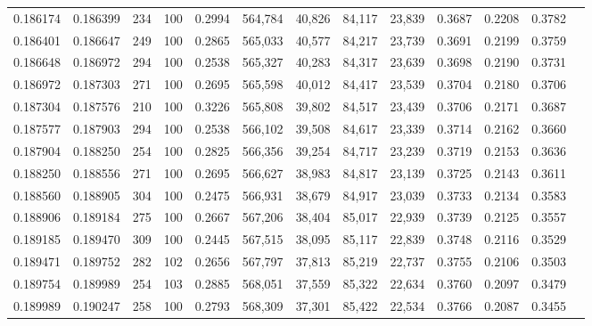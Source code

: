 \begin{tabular}{rrrrrrrrrrrrr}
0.186174 & 0.186399 &   234 & 100 &                                     0.2994 & 564,784 &  40,826 &  84,117 &  23,839 & 0.3687 & 0.2208 & 0.3782 \\
0.186401 & 0.186647 &   249 & 100 &                                     0.2865 & 565,033 &  40,577 &  84,217 &  23,739 & 0.3691 & 0.2199 & 0.3759 \\
0.186648 & 0.186972 &   294 & 100 &                                     0.2538 & 565,327 &  40,283 &  84,317 &  23,639 & 0.3698 & 0.2190 & 0.3731 \\
0.186972 & 0.187303 &   271 & 100 &                                     0.2695 & 565,598 &  40,012 &  84,417 &  23,539 & 0.3704 & 0.2180 & 0.3706 \\
0.187304 & 0.187576 &   210 & 100 &                                     0.3226 & 565,808 &  39,802 &  84,517 &  23,439 & 0.3706 & 0.2171 & 0.3687 \\
0.187577 & 0.187903 &   294 & 100 &                                     0.2538 & 566,102 &  39,508 &  84,617 &  23,339 & 0.3714 & 0.2162 & 0.3660 \\
0.187904 & 0.188250 &   254 & 100 &                                     0.2825 & 566,356 &  39,254 &  84,717 &  23,239 & 0.3719 & 0.2153 & 0.3636 \\
0.188250 & 0.188556 &   271 & 100 &                                     0.2695 & 566,627 &  38,983 &  84,817 &  23,139 & 0.3725 & 0.2143 & 0.3611 \\
0.188560 & 0.188905 &   304 & 100 &                                     0.2475 & 566,931 &  38,679 &  84,917 &  23,039 & 0.3733 & 0.2134 & 0.3583 \\
0.188906 & 0.189184 &   275 & 100 &                                     0.2667 & 567,206 &  38,404 &  85,017 &  22,939 & 0.3739 & 0.2125 & 0.3557 \\
0.189185 & 0.189470 &   309 & 100 &                                     0.2445 & 567,515 &  38,095 &  85,117 &  22,839 & 0.3748 & 0.2116 & 0.3529 \\
0.189471 & 0.189752 &   282 & 102 &                                     0.2656 & 567,797 &  37,813 &  85,219 &  22,737 & 0.3755 & 0.2106 & 0.3503 \\
0.189754 & 0.189989 &   254 & 103 &                                     0.2885 & 568,051 &  37,559 &  85,322 &  22,634 & 0.3760 & 0.2097 & 0.3479 \\
0.189989 & 0.190247 &   258 & 100 &                                     0.2793 & 568,309 &  37,301 &  85,422 &  22,534 & 0.3766 & 0.2087 & 0.3455 \\

\end{tabular}
